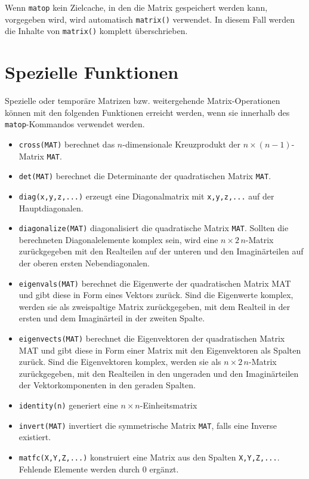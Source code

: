 \documentclass[DIV=14,headsepline,footsepline]{scrbook}
\begin{document}
				Wenn \verb+matop+ kein Zielcache, in den die Matrix gespeichert werden kann, vorgegeben wird, wird automatisch \verb+matrix()+ verwendet. In diesem Fall werden die Inhalte von \verb+matrix()+ komplett überschrieben.
				
			\section{Spezielle Funktionen}
				Spezielle oder temporäre Matrizen bzw. weitergehende Matrix-Operationen können mit den folgenden Funktionen erreicht werden, wenn sie innerhalb des \verb+matop+-Kommandos verwendet werden.
				\begin{itemize}
					\item \verb+cross(MAT)+ berechnet das $n$-dimensionale Kreuzprodukt der $n\times(n-1)$-Matrix \verb+MAT+.
					\item \verb+det(MAT)+ berechnet die Determinante der quadratischen Matrix \verb+MAT+.
					\item \verb+diag(x,y,z,...)+ erzeugt eine Diagonalmatrix mit \verb+x,y,z,...+ auf der Hauptdiagonalen.
					\item \verb+diagonalize(MAT)+ diagonalisiert die quadratische Matrix \verb+MAT+. Sollten die berechneten Diagonalelemente komplex sein, wird eine $n\times2\,n$-Matrix zurückgegeben mit den Realteilen auf der unteren und den Imaginärteilen auf der oberen ersten Nebendiagonalen.
					\item \verb+eigenvals(MAT)+ berechnet die Eigenwerte der quadratischen Matrix MAT und gibt diese in Form eines Vektors zurück. Sind die Eigenwerte komplex, werden sie als zweispaltige Matrix zurückgegeben, mit dem Realteil in der ersten und dem Imaginärteil in der zweiten Spalte.
					\item \verb+eigenvects(MAT)+ berechnet die Eigenvektoren der quadratischen Matrix MAT und gibt diese in Form einer Matrix mit den Eigenvektoren als Spalten zurück. Sind die Eigenvektoren komplex, werden sie als $n \times 2\,n$-Matrix zurückgegeben, mit den Realteilen in den ungeraden und den Imaginärteilen der Vektorkomponenten in den geraden Spalten.
					\item \verb+identity(n)+ generiert eine $n\times n$-Einheitsmatrix
					\item \verb+invert(MAT)+ invertiert die symmetrische Matrix \verb+MAT+, falls eine Inverse existiert.
					\item \verb+matfc(X,Y,Z,...)+ konstruiert eine Matrix aus den Spalten \verb+X,Y,Z,...+. Fehlende Elemente werden durch 0 ergänzt.

\end{itemize}
\end{document}
